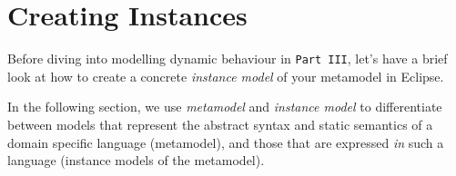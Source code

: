 \newpage
\genHeader

\section{Creating Instances}

\hypertarget{creatingInstance common}{}Before diving into modelling dynamic behaviour in \texttt{Part III}, let's have a brief look at how to create a concrete
\emph{instance model} of your metamodel in Eclipse.

In the following section, we use \emph{metamodel} and \emph{instance model} to differentiate between models that represent the abstract syntax and static
semantics of a domain specific language (metamodel), and those that are expressed \emph{in} such a language (instance models of the metamodel).


